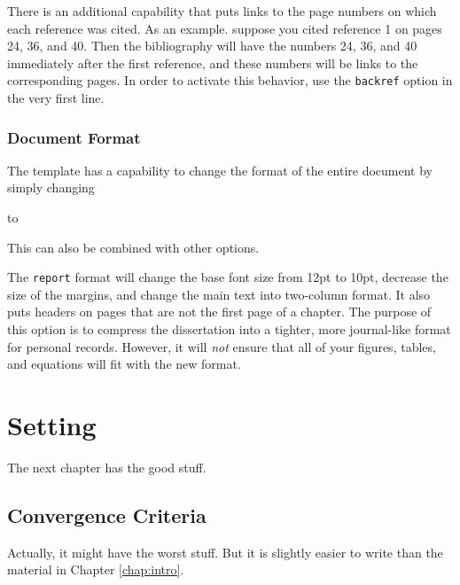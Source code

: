 \documentclass[thesis]{./tex/thesis-umich}
\begin{document}
There is an additional capability that puts links to the page numbers on
which each reference was cited.  As an example. suppose you cited
reference 1 on pages 24, 36, and 40.  Then the bibliography will have
the numbers 24, 36, and 40 immediately after the first reference, and
these numbers will be links to the corresponding pages.  In order to
activate this behavior, use the \verb|backref| option in the very first
line.



\subsection{Document Format}
The template has a capability to change the format of the entire
document by simply changing
to
This can also be combined with other options.
The \verb|report| format will change the base font size from 12pt to
10pt, decrease the size of the margins, and change the main text into
two-column format.  It also puts headers on pages that are not the first
page of a chapter.  The purpose of this option is to compress the
dissertation into a tighter, more journal-like format for personal
records.  However, it will \emph{not} ensure that all of your figures,
tables, and equations will fit with the new format.




\chapter{Setting}
The next chapter has the good stuff.

\section{Convergence Criteria}
Actually, it might have the worst stuff.  But it is slightly easier to
write than the material in Chapter \ref{chap:intro}.
\end{document}
